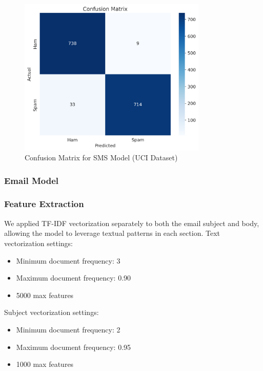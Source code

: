 \documentclass{article}
\begin{document}
\begin{figure}[htbp]
    \centering
    \includegraphics[width=0.8\textwidth]{../analysis/sms/randomforest/uci/confusion_matrix.png}
    \caption{Confusion Matrix for SMS Model (UCI Dataset)}
    \label{fig:confusion_matrix_3}
\end{figure}

\newpage

\subsubsection{Email Model}
\subsubsection*{Feature Extraction}
We applied TF-IDF vectorization separately to both the email subject and body, allowing the model to leverage textual patterns in each section.
\newline
\newline
Text vectorization settings:
\begin{itemize}
    \item Minimum document frequency: 3
    \item Maximum document frequency: 0.90
    \item 5000 max features
\end{itemize}

\noindent
Subject vectorization settings:
\begin{itemize}
    \item Minimum document frequency: 2
    \item Maximum document frequency: 0.95
    \item 1000 max features
\end{itemize}
\end{document}
